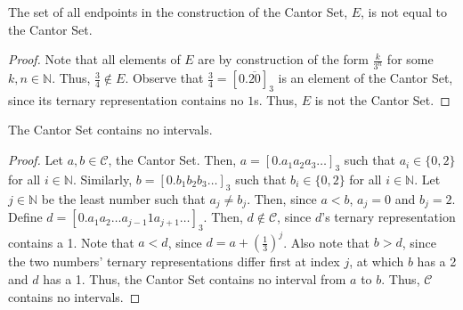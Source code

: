 \documentclass[12pt]{article}
\begin{document}
\newpage
{} The set of all endpoints in the construction of the Cantor Set, $E$, is not equal to the Cantor Set.
\begin{proof}
    Note that all elements of $E$ are by construction of the form $\frac k{3^n}$ for some $k,n \in \mathbb N$. Thus, $\frac34\notin E$. Observe that $\frac34 = [0.\overline{20}]_3$ is an element of the Cantor Set, since its ternary representation contains no $1$s. Thus, $E$ is not the Cantor Set.
\end{proof}

\newpage
{} The Cantor Set contains no intervals.
\begin{proof}
    Let $a, b \in \mathcal C$, the Cantor Set. Then, $a = [0.a_1a_2a_3\hdots]_3$ such that $a_i \in \{0,2\}$ for all $i \in \mathbb N$. Similarly, $b = [0.b_1b_2b_3\hdots]_3$ such that $b_i \in \{0,2\}$ for all $i \in \mathbb N$. Let $j \in \mathbb N$ be the least number such that $a_j \neq b_j$. Then, since $a < b$, $a_j = 0$ and $b_j = 2$. Define $d = [0.a_1a_2 \hdots a_{j-1}1a_{j+1}\hdots]_3$. Then, $d \notin \mathcal C$, since $d$'s ternary representation contains a 1. Note that $a < d$, since $d = a + \left(\frac13\right)^j$. Also note that $b > d$, since the two numbers' ternary representations differ first at index $j$, at which $b$ has a 2 and $d$ has a 1. Thus, the Cantor Set contains no interval from $a$ to $b$. Thus, $\mathcal C$ contains no intervals.
\end{proof}
\end{document}
